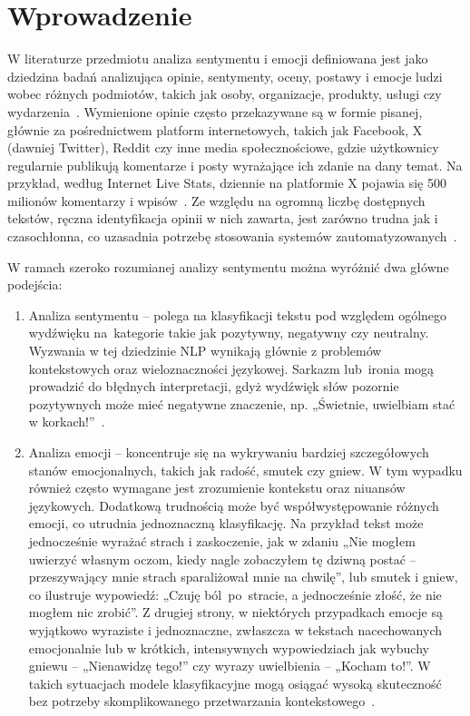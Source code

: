 \chapter{Wprowadzenie}
W literaturze przedmiotu analiza sentymentu i emocji definiowana jest jako dziedzina badań analizująca opinie, sentymenty, oceny, postawy i emocje ludzi wobec różnych podmiotów, takich jak osoby, organizacje, produkty, usługi czy wydarzenia~\cite{Liu2012}. Wymienione opinie często przekazywane są w formie pisanej, głównie za pośrednictwem platform internetowych, takich jak Facebook, X (dawniej Twitter), Reddit czy inne media społecznościowe, gdzie użytkownicy regularnie publikują komentarze i posty wyrażające ich zdanie na dany temat. Na przykład, według Internet Live Stats, dziennie na platformie X pojawia się 500 milionów komentarzy i wpisów~\cite{TwitterStats}. Ze względu na ogromną liczbę dostępnych tekstów, ręczna identyfikacja opinii w nich zawarta, jest zarówno trudna jak i czasochłonna, co uzasadnia potrzebę stosowania systemów zautomatyzowanych~\cite{Liu2012}.

W ramach szeroko rozumianej analizy sentymentu można wyróżnić dwa główne podejścia:
\begin{enumerate}
    \item Analiza sentymentu -- polega na klasyfikacji tekstu pod względem ogólnego wydźwięku na~kategorie takie jak pozytywny, negatywny czy neutralny. Wyzwania w tej dziedzinie NLP wynikają głównie z problemów kontekstowych oraz wieloznaczności językowej. Sarkazm lub~ironia mogą prowadzić do błędnych interpretacji, gdyż wydźwięk słów pozornie pozytywnych może mieć negatywne znaczenie, np. „Świetnie, uwielbiam stać w korkach!”~\cite{Sarcasm}.
    \item Analiza emocji -- koncentruje się na wykrywaniu bardziej szczegółowych stanów emocjonalnych, takich jak radość, smutek czy gniew. W tym wypadku również często wymagane jest zrozumienie kontekstu oraz niuansów językowych. Dodatkową trudnością może być współwystępowanie różnych emocji, co utrudnia jednoznaczną klasyfikację. Na przykład tekst może jednocześnie wyrażać strach i zaskoczenie, jak w zdaniu „Nie mogłem uwierzyć własnym oczom, kiedy nagle zobaczyłem tę dziwną postać -- przeszywający mnie strach sparaliżował mnie na chwilę”, lub smutek i gniew, co ilustruje wypowiedź: „Czuję ból~po~stracie, a jednocześnie złość, że nie mogłem nic zrobić”. Z drugiej strony, w niektórych przypadkach emocje są wyjątkowo wyraziste i jednoznaczne, zwłaszcza w tekstach nacechowanych emocjonalnie lub w krótkich, intensywnych wypowiedziach jak wybuchy gniewu -- „Nienawidzę tego!” czy wyrazy uwielbienia -- „Kocham to!”. W takich sytuacjach modele klasyfikacyjne mogą osiągać wysoką skuteczność bez potrzeby skomplikowanego przetwarzania kontekstowego~\cite{Emotions}.
\end{enumerate}

